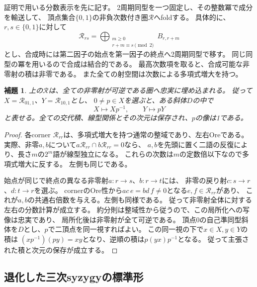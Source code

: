 \documentclass[11pt,a4paper]{ltjsarticle}
\newtheorem{lemma}[theorem]{補題}
\theoremstyle{definition}
\begin{document}
証明で用いる分数表示を先に記す。
2周期同型を一つ固定し、その整数冪で成分を輸送して、
頂点集合$\{0,1\}$の非負次数付き圏$\mathcal R$へfoldする。
具体的に、$r,s\in\{0,1\}$に対して
\[
\mathcal R_{rs}=
\bigoplus_{\substack{m\ge0\\r+m\equiv s\pmod2}}B_{r,r+m}
\]
とし、合成時には第二因子の始点を第一因子の終点へ2周期同型で移す。
同じ同型の冪を用いるので合成は結合的である。
最高次数項を取ると、合成可能な非零射の積は非零である。
また全ての射空間は次数による多項式増大を持つ。

\begin{lemma}\label{p2base:lem:fraction-frame}
上の$\mathcal R$は、全ての非零射が可逆である圏へ忠実に埋め込まれる。
従って$X=\mathcal R_{01,1}$、$Y=\mathcal R_{10,1}$とし、
$0\ne p\in X$を選ぶと、ある斜体$D$の中で
\[
X\longmapsto Xp^{-1},\qquad Y\longmapsto pY
\]
と表せる。全ての交代積、線型関係とその次元は保存され、$p$の像は1である。
\end{lemma}
\begin{proof}
各corner $\mathcal R_{rr}$は、多項式増大を持つ通常の整域であり、左右Oreである。
実際、非零$a,b$について$a\mathcal R_{rr}\cap b\mathcal R_{rr}=0$なら、
$a,b$を先頭に置く二語の反復により、長さ$m$の$2^m$語が線型独立になる。
これらの次数は$m$の定数倍以下なので多項式増大に反する。
左側も同じである。

始点が同じで終点の異なる非零射$a:r\to s$、$b:r\to t$には、
非零の戻り射$c:s\to r$、$d:t\to r$を選ぶ。
cornerのOre性から$ac\,e=bd\,f\ne0$となる$e,f\in\mathcal R_{rr}$があり、
これが$a,b$の共通右倍数を与える。左側も同様である。
従って非零射全体に対する左右の分数計算が成立する。
約分則は整域性から従うので、この局所化への写像は忠実であり、
局所化後は非零射が全て可逆である。
頂点0の自己準同型斜体を$D$とし、$p$で二頂点を同一視すればよい。
この同一視の下で$x\in X,y\in Y$の積は
$(xp^{-1})(py)=xy$となり、逆順の積は$p(yx)p^{-1}$となる。
従って主張された積と次元の保存が成立する。
\end{proof}

\subsection{退化した三次syzygyの標準形}
\end{document}
